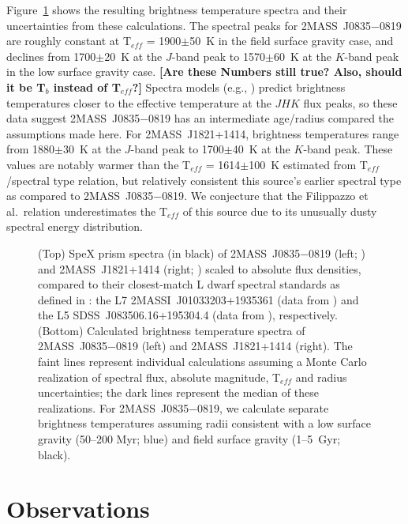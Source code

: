 \documentclass[twocolumn]{aastex6}
\newcommand{\teff}{T$_{eff}$}
\newcommand{\sha}{2MASS~J0835$-$0819}
\newcommand{\shb}{2MASS~J1821+1414}
\begin{document}
Figure~\ref{fig:tbright} shows the resulting brightness temperature spectra and their uncertainties from these calculations.  The spectral peaks for {\sha} are roughly constant at {\teff} = 1900$\pm$50~K in the field surface gravity case, and declines from 1700$\pm$20~K at the $J$-band peak to 1570$\pm$60~K at the $K$-band peak in the low surface gravity case.
{\bf [Are these Numbers still true? Also, should it be T$_b$ instead of T$_{eff}$?]}
Spectra models (e.g., \citealt{2012RSPTA.370.2765A}) predict brightness temperatures closer to the effective temperature at the $JHK$ flux peaks, so these data suggest {\sha} has an intermediate age/radius compared the assumptions made here. For {\shb}, 
brightness temperatures range from 1880$\pm$30~K at the $J$-band peak to 1700$\pm$40~K at the $K$-band peak.
These values are notably warmer than the {\teff} = 1614$\pm$100~K estimated from \citet{2015ApJ...810..158F} {\teff}/spectral type relation, but relatively consistent this source's earlier spectral type as compared to {\sha}. We conjecture that the Filippazzo et al.\ relation underestimates the {\teff} of this source due to its unusually dusty spectral energy distribution.

\begin{figure}
\centering
	\caption{(Top) SpeX prism spectra (in black) of {\sha} (left; \citealt{2010ApJ...710.1142B}) and {\shb} (right; \citealt{2008ApJ...686..528L}) scaled to absolute flux densities, compared to their closest-match L dwarf spectral standards as defined in \citet[in red]{2010ApJS..190..100K}: the L7 2MASSI~J01033203+1935361 (data from \citealt{2014ApJ...794..143B}) and the L5 SDSS~J083506.16+195304.4 (data from \citealt{2006AJ....131.2722C}), respectively.  (Bottom) Calculated brightness temperature spectra of {\sha} (left) and {\shb} (right). The faint lines represent individual calculations assuming a Monte Carlo realization of spectral flux, absolute magnitude, {\teff} and radius uncertainties; the dark lines represent the median of these realizations. For {\sha}, we calculate separate brightness temperatures assuming radii consistent with a low surface gravity (50--200 Myr; blue) and field surface gravity (1--5~Gyr; black). }
	\label{fig:tbright}
	\vspace{0.1in}
\end{figure} 

\section{Observations}\label{sec:obs}
\end{document}
